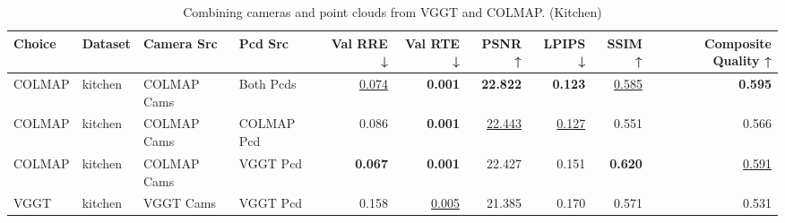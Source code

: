 \begin{table}[H]
\caption{\ifdefined\customcaption \customcaption \else Combining cameras and point clouds from VGGT and COLMAP. (Kitchen) \fi}
\label{tab:07_combined_single_kitchen}
\centering
\tiny
\begin{tabular}{llllrrrrrr}
\toprule
Choice & Dataset & Camera Src & Pcd Src & Val RRE ↓ & Val RTE ↓ & PSNR ↑ & LPIPS ↓ & SSIM ↑ & Composite Quality ↑ \\
\midrule
COLMAP & kitchen & COLMAP Cams & Both Pcds & \underline{0.074} & \textbf{0.001} & \textbf{22.822} & \textbf{0.123} & \underline{0.585} & \textbf{0.595} \\
COLMAP & kitchen & COLMAP Cams & COLMAP Pcd & 0.086 & \textbf{0.001} & \underline{22.443} & \underline{0.127} & 0.551 & 0.566 \\
COLMAP & kitchen & COLMAP Cams & VGGT Pcd & \textbf{0.067} & \textbf{0.001} & 22.427 & 0.151 & \textbf{0.620} & \underline{0.591} \\
VGGT & kitchen & VGGT Cams & VGGT Pcd & 0.158 & \underline{0.005} & 21.385 & 0.170 & 0.571 & 0.531 \\
\bottomrule
\end{tabular}
\end{table}